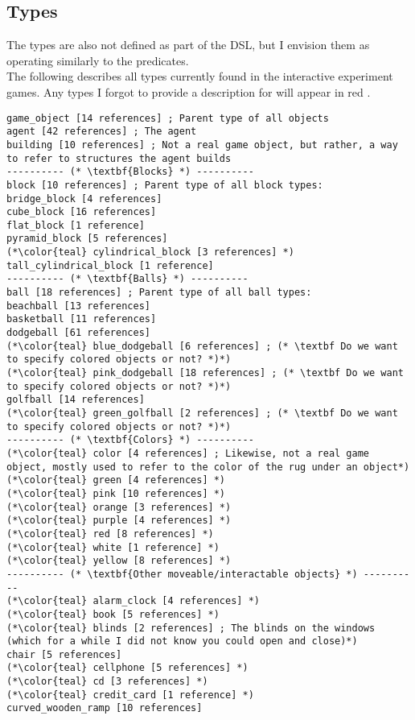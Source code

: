 \documentclass{article}
\begin{document}
\subsection{Types}
The types are also not defined as part of the DSL, but I envision them as operating similarly to the predicates. \\
            
            The following describes all types currently found in the interactive experiment games. Any types I forgot to provide a description for will appear in {\color{red}red }.
        
\begin{lstlisting}
game_object [14 references] ; Parent type of all objects
agent [42 references] ; The agent
building [10 references] ; Not a real game object, but rather, a way to refer to structures the agent builds
---------- (* \textbf{Blocks} *) ----------
block [10 references] ; Parent type of all block types:
bridge_block [4 references] 
cube_block [16 references] 
flat_block [1 reference] 
pyramid_block [5 references] 
(*\color{teal} cylindrical_block [3 references] *)
tall_cylindrical_block [1 reference] 
---------- (* \textbf{Balls} *) ----------
ball [18 references] ; Parent type of all ball types:
beachball [13 references] 
basketball [11 references] 
dodgeball [61 references] 
(*\color{teal} blue_dodgeball [6 references] ; (* \textbf Do we want to specify colored objects or not? *)*)
(*\color{teal} pink_dodgeball [18 references] ; (* \textbf Do we want to specify colored objects or not? *)*)
golfball [14 references] 
(*\color{teal} green_golfball [2 references] ; (* \textbf Do we want to specify colored objects or not? *)*)
---------- (* \textbf{Colors} *) ----------
(*\color{teal} color [4 references] ; Likewise, not a real game object, mostly used to refer to the color of the rug under an object*)
(*\color{teal} green [4 references] *)
(*\color{teal} pink [10 references] *)
(*\color{teal} orange [3 references] *)
(*\color{teal} purple [4 references] *)
(*\color{teal} red [8 references] *)
(*\color{teal} white [1 reference] *)
(*\color{teal} yellow [8 references] *)
---------- (* \textbf{Other moveable/interactable objects} *) ----------
(*\color{teal} alarm_clock [4 references] *)
(*\color{teal} book [5 references] *)
(*\color{teal} blinds [2 references] ; The blinds on the windows (which for a while I did not know you could open and close)*)
chair [5 references] 
(*\color{teal} cellphone [5 references] *)
(*\color{teal} cd [3 references] *)
(*\color{teal} credit_card [1 reference] *)
curved_wooden_ramp [10 references] 

\end{lstlisting}
\end{document}

